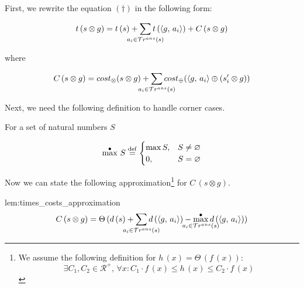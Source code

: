 First, we rewrite the equation $(\dagger)$ in the following form:

\[ t\,(s \otimes g)  =  t\,(s) + \smashoperator[lr]{\sum\limits_{a_i \in \tra{s}}} t\,(\taskst{g}{a_i}) + C\,(s \otimes g) \]

where

\[ C\,(s \otimes g) = \costconj{s}{g} + \smashoperator[lr]{\sum\limits_{a_i \in \tra{s}}} \costdisj{\taskst{g}{a_i}}{(s'_i \otimes g)} \]

Next, we need the following definition to handle corner cases.

\begin{comment}
\begin{definition}
Let $E$ be a set of environments, $g$~--- a goal. Then we call the value

\[
\alpha\,(g, E) = \argmax{e \in E} d\,(\taskst{g}{e})
\]

a \emph{pincipal environment}.
\end{definition}

In other words, $\alpha\,(g, E)$ is an element of $E$ which delivers the longest trace of $g$.
\end{comment}

\begin{definition}

For a set of natural numbers $S$

\[
\max^{\bullet} \, S \overset{\mathrm{def}}{=}
\begin{cases}
\max S,  & S \ne \varnothing \\
0, & S = \varnothing\\
\end{cases}
\]

\end{definition}


Now we can state the following approximation\footnote{We assume the following definition for
$h\,(x) = \Theta\,(f\,(x))$: \[\exists C_1, C_2 \in \mathcal{R^{+}}, \, \forall x : C_1 \cdot f\,(x) \le h\,(x) \le C_2 \cdot f\,(x) \]}
for $C\,(s \otimes g)$.

\begin{replemma}{lem:times_costs_approximation}
\[
C\,(s \otimes g) =
\Theta\,(d\,(s) + \smashoperator[lr]{\sum\limits_{a_i \in \tra{s}}} d\,(\taskst{g}{a_i}) - \smashoperator{\maxd\limits_{a_i \in \tra{s}}} d\,(\taskst{g}{a_i}))	
\]
\end{replemma}

